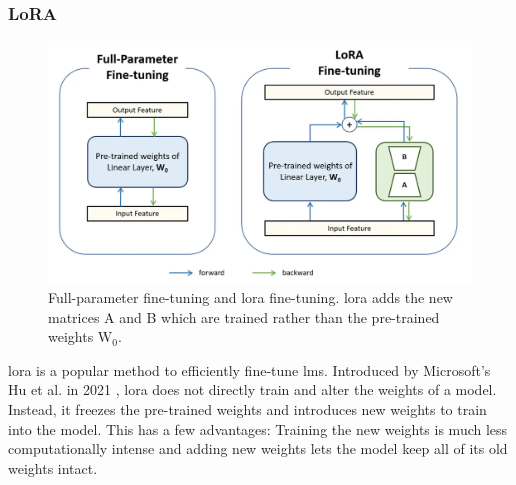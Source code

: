 \subsubsection{LoRA}
\label{sec:lora}

\begin{figure}
    \centering
    \includegraphics[width=\textwidth]{bilder/kapitel2/lora.png}
    \caption{Full-parameter fine-tuning and \ac{lora} fine-tuning. \ac{lora} adds the new matrices A and B which are trained rather than the pre-trained weights W$_0$\protect\footnotemark.}
    \label{fig:lora}
\end{figure}

\Ac{lora} is a popular method to efficiently fine-tune \acp{lm}.
Introduced by Microsoft's Hu et al. in 2021 \cite{Hu.2022}, \ac{lora} does not directly train and alter the weights of a model.
Instead, it freezes the pre-trained weights and introduces new weights to train into the model.
This has a few advantages: Training the new weights is much less computationally intense and adding new weights lets the model keep all of its old weights intact.

